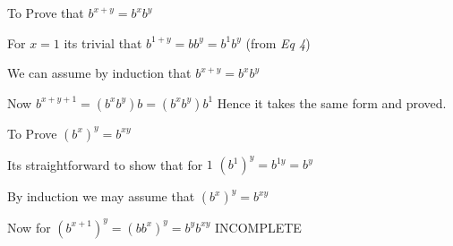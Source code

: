 \documentclass[12pt]{article}
\begin{document}
\begin{enumerate}
  \begin{item}

    To Prove that $b^{x+y} = b^xb^y$

    For $x = 1$ its trivial that $b^{1+y} = bb^y = b^1b^y$ (from {\sl Eq 4})

    We can assume by induction that $b^{x+y} = b^xb^y$

    Now $b^{x+y+1} = (b^xb^y)b = (b^xb^y)b^1$ Hence it takes the same form and proved.


    To Prove $(b^x)^y = b^{xy}$

    Its straightforward to show that for $1$ $(b^1)^y = b^{1y} = b^y $

    By induction we may assume that  $(b^x)^y = b^{xy}$

    Now for $({b^{x+1}})^y = {(bb^x)}^y = b^yb^{xy} $ INCOMPLETE
    
  \end{item}

  \begin{item}
    
  \end{item}

  \begin{item}
  \end{item}

  \begin{item}
  \end{item}

  \begin{item}
  \end{item}

  \begin{item}
  \end{item}

  \begin{item}
  \end{item}

  \begin{item}
  \end{item}

  \begin{item}
  \end{item}

  \begin{item}
  \end{item}

  \begin{item}
  \end{item}

  \begin{item}
  \end{item}


\end{enumerate}
\end{document}
